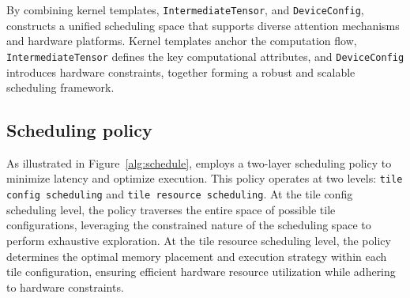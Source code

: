 By combining kernel templates, \texttt{IntermediateTensor}, and \texttt{DeviceConfig}, \oursys{} constructs a unified scheduling space that supports diverse attention mechanisms and hardware platforms. Kernel templates anchor the computation flow, \texttt{IntermediateTensor} defines the key computational attributes, and \texttt{DeviceConfig} introduces hardware constraints, together forming a robust and scalable scheduling framework.

\subsection{Scheduling policy}

As illustrated in Figure~\ref{alg:schedule}, \oursys{} employs a two-layer scheduling policy to minimize latency and optimize execution. This policy operates at two levels: \texttt{tile config scheduling} and \texttt{tile resource scheduling}. At the tile config scheduling level, the policy traverses the entire space of possible tile configurations, leveraging the constrained nature of the scheduling space to perform exhaustive exploration. At the tile resource scheduling level, the policy determines the optimal memory placement and execution strategy within each tile configuration, ensuring efficient hardware resource utilization while adhering to hardware constraints.


